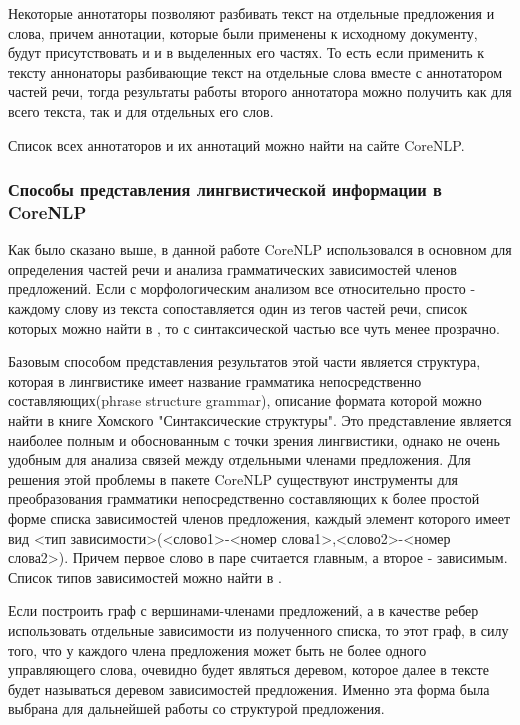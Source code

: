 Некоторые аннотаторы позволяют разбивать текст на отдельные предложения и слова,
причем аннотации, которые были применены к исходному документу, будут присутствовать и
и в выделенных его частях. 
То есть если применить к тексту аннонаторы разбивающие текст на отдельные слова
вместе с аннотатором частей речи, тогда результаты работы второго аннотатора
можно получить как для всего текста, так и для отдельных его слов.

Список всех аннотаторов и их аннотаций можно найти на сайте CoreNLP\cite{corenlp}.

\subsubsection{Способы представления лингвистической информации в CoreNLP}

Как было сказано выше, в данной работе CoreNLP использовался в основном для 
определения частей речи и анализа грамматических зависимостей
членов предложений.
Если с морфологическим анализом все относительно просто - каждому слову
из текста сопоставляется один из тегов частей речи, список которых можно найти в \cite{treebank},
то с синтаксической частью все чуть менее прозрачно.

Базовым способом представления результатов этой части является структура,
которая в лингвистике имеет название грамматика непосредственно составляющих(phrase structure grammar), 
описание формата которой можно найти в книге Хомского "Синтаксические структуры"\cite{homsky}.
Это представление является наиболее полным и обоснованным с точки зрения лингвистики, 
однако не очень удобным для анализа связей между отдельными членами предложения.
Для решения этой проблемы в пакете CoreNLP существуют инструменты для 
преобразования грамматики непосредственно составляющих к более простой форме
списка зависимостей членов предложения, каждый элемент которого имеет вид 
<тип зависимости>(<слово1>-<номер слова1>,<слово2>-<номер слова2>).
Причем первое слово в паре считается главным, а второе - зависимым.
Список типов зависимостей можно найти в \cite{dependencies}.

Если построить граф с вершинами-членами предложений, а в качестве ребер использовать 
отдельные зависимости из полученного списка, то этот граф, в силу того, что у каждого члена
предложения может быть не более одного управляющего слова, очевидно будет
являться деревом, которое далее в тексте будет называться деревом зависимостей предложения.
Именно эта форма была выбрана для дальнейшей работы со структурой
предложения.

